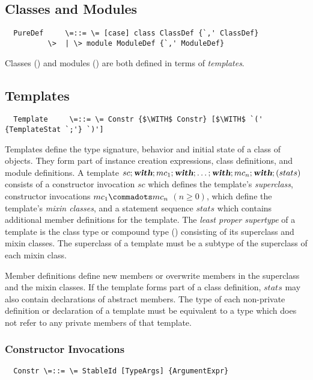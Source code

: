 \documentclass[11pt]{report}
\begin{document}
\begin{itemize}
\chapter{Classes and Modules}
\label{sec:globaldefs}

\syntax\begin{verbatim}
  PureDef     \=::= \= [case] class ClassDef {`,' ClassDef}
	      \>  | \> module ModuleDef {`,' ModuleDef}
\end{verbatim}

Classes () and modules
() are both defined in terms of {\em templates}.

\section{Templates}
\label{sec:templates}

\syntax\begin{verbatim}
  Template     \=::= \= Constr {$\WITH$ Constr} [$\WITH$ `(' {TemplateStat `;'} `)']
\end{verbatim}

Templates define the type signature, behavior and initial state of a
class of objects. They form part of instance creation expressions,
class definitions, and module definitions.  A template
$sc;\mbox{\sl\bfseries with};mc_1;\mbox{\sl\bfseries with};\ldots;\mbox{\sl\bfseries with};mc_n;\mbox{\sl\bfseries with};(stats)$ consists of a
constructor invocation $sc$ which defines the template's {\em
superclass}, constructor invocations $mc_1 \commadots mc_n$ $(n \geq
0)$, which define the template's {\em mixin classes}, and a statement
sequence $stats$ which contains additional member definitions for the
template.  The {\em least proper supertype} of a template is the class
type or compound type () consisting of its
superclass and mixin classes. The superclass of a template must be a
subtype of the superclass of each mixin class.

Member definitions define new members or overwrite members in the
superclass and the mixin classes.  If the template forms part of a
class definition, $stats$ may also contain declarations of abstract
members. The type of each non-private definition or declaration of a
template must be equivalent to a type which does not refer to any
private members of that template.

\subsection{Constructor Invocations}
\label{sec:constr-invoke}
\syntax\begin{verbatim}
  Constr \=::= \= StableId [TypeArgs] {ArgumentExpr}
\end{verbatim}


\end{itemize}
\end{document}
